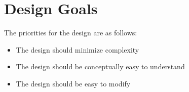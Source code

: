 \section{Design Goals}
\label{section:designGoals}

The priorities for the design are as follows:
\begin{itemize}
    \item The design should minimize complexity
    \item The design should be conceptually easy to understand
    \item The design should be easy to modify
\end{itemize}